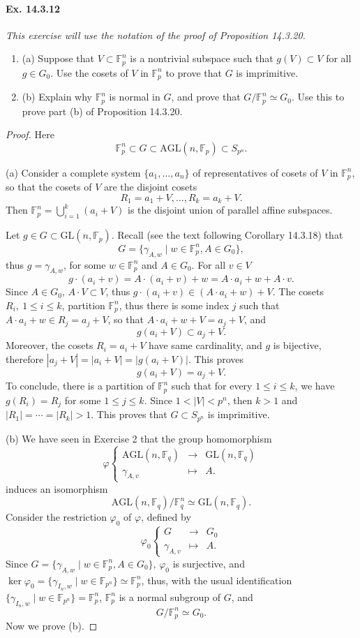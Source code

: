 \documentclass[11pt,a4paper]{article}
\newcommand{\be} {\begin{enumerate}}
\newcommand{\ee} {\end{enumerate}}
\newcommand{\F}{\mathbb{F}}
\begin{document}
  \paragraph{Ex. 14.3.12}{\it This exercise will use the notation of the proof of Proposition 14.3.20.
  \be
  \item[(a)] Suppose that $V \subset \F_p^n$ is a nontrivial subspace such that $g(V) \subset V$ for all $g\in G_0$. Use the cosets of $V$ in $\F_p^n$ to prove that $G$ is imprimitive.
  \item[(b)] Explain why $\F_p^n$ is normal in $G$, and prove that $G/\F_p^n \simeq G_0$. Use this to prove part (b) of Proposition 14.3.20.
  \ee
 }
 \begin{proof}
 Here
 $$\F_p^n \subset G \subset \mathrm{AGL}(n,\F_p) \subset S_{p^n}.$$
 \item[(a)] Consider a complete system $\{a_1,\ldots,a_n\}$ of representatives of cosets of $V$ in $\F_p^n$, so that the cosets of $V$ are the disjoint cosets $$R_1 = a_1+V, \ldots,R_k = a_k + V.$$
 Then $\F_p^n = \bigcup\limits_{i=1}^k (a_i + V)$ is the disjoint union of parallel affine subspaces.
 
 Let $g \in G \subset \mathrm{GL}(n,\F_p)$. Recall (see the text following Corollary 14.3.18) that
 $$G = \{\gamma_{A,w} \mid w \in \F_p^n, A \in G_0\},$$
 thus $g = \gamma_{A,w}$, for some $w\in \F_p^n$ and $A\in G_0$. For all $v \in V$
 $$g\cdot (a_i + v) = A\cdot (a_i + v) + w =A\cdot a_i + w + A\cdot v.$$
Since $A \in G_0$, $A \cdot V \subset V$, thus $g\cdot (a_i + v) \in (A\cdot a_i + w)+ V.$ The cosets $R_i,\ 1\leq i \leq k$, partition $\F_p^n$, thus there is some index $j$ such that $A\cdot a_i + w \in R_j = a_j + V$, so that $A\cdot a_i + w + V = a_j + V$, and 
 $$g(a_i + V) \subset a_j + V.$$ 
Moreover, the cosets $R_i = a_i +V$ have same cardinality, and $g$ is bijective, therefore $|a_j + V| = |a_i + V| = |g(a_i + V)|$. This proves
  $$g(a_i + V) = a_j + V.$$ 
  To conclude, there is a partition of $\F_p^n$ such that for every $1\leq i \leq k$, we have $g(R_i) = R_j$ for some $1\leq j \leq k$. Since $1<|V|<p^n$, then $k>1$ and $|R_1| =\cdots=|R_k|>1$. This proves that $G\subset S_{p^n}$ is imprimitive.
  
  \item[(b)] We have seen in Exercise 2 that the group homomorphism
  $$
\varphi
\left\{
\begin{array}{ccc}
\mathrm{AGL}(n,\F_q) & \to &\mathrm{GL}(n,\F_q)\\
\gamma_{A,v} & \mapsto &A.
\end{array}
\right.
$$
induces an isomorphism 
$$\mathrm{AGL}(n,\F_q)/ \F_q^n \simeq \mathrm{GL}(n,\F_q).$$
Consider the restriction $\varphi_0$ of $\varphi$, defined by
 $$
\varphi_0
\left\{
\begin{array}{ccc}
G & \to &G_0\\
\gamma_{A,v} & \mapsto &A.
\end{array}
\right.
$$
Since $G = \{\gamma_{A,w} \mid w \in \F_p^n, A \in G_0\}$, $\varphi_0$ is surjective, and $\ker \varphi_0 = \{\gamma_{I_n,w} \mid w \in \F_{p^n}\} \simeq \F_p^n$, thus, with the usual identification $ \{\gamma_{I_n,w} \mid w \in \F_{p^n}\} = \F_p^n$, $\F_p^n$  is a normal subgroup of $G$, and
$$G/\F_p^n \simeq G_0.$$
Now we prove (b).


\end{proof}
\end{document}
